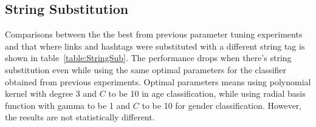 \documentclass[a4paper]{llncs}
\begin{document}


\subsection{String Substitution}
Comparisons between the the best from previous parameter tuning experiments and that where links and hashtags were substituted with a different string tag is shown in table~\ref{table:StringSub}. The performance drops when there's string substitution even while using the same optimal parameters for the classifier obtained from previous experiments. Optimal parameters means using polynomial kernel with degree 3 and $C$ to be 10 in age classification, while using radial basis function with gamma to be 1 and $C$ to be 10 for gender classification. However, the results are not statistically different. 
\end{document}
